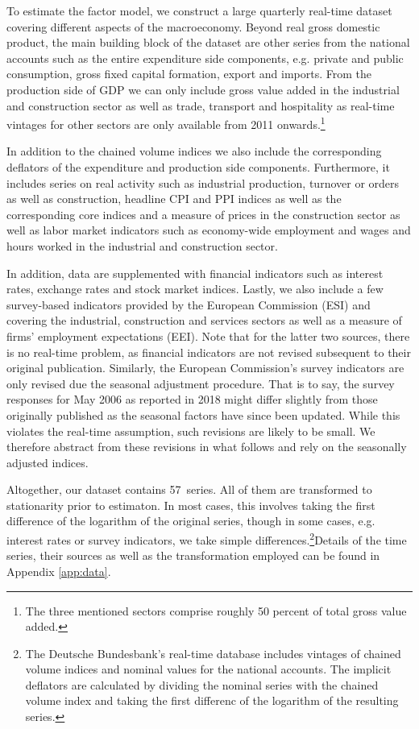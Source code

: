 \documentclass[notitlepage,a4paper,12pt]{article}
\newcommand\NumSeries{57}
\begin{document}
To estimate the factor model, we construct a large quarterly real-time dataset covering different aspects of the macroeconomy. Beyond real gross domestic product, the main building block of the dataset are other series from the national accounts such as the entire expenditure side components, e.g. private and public consumption, gross fixed capital formation, export and imports. From the production side of GDP we can only include gross value added in the industrial and construction sector as well as trade, transport and hospitality as real-time vintages for other sectors are only available from 2011 onwards.\footnote{The three mentioned sectors comprise roughly 50 percent of total gross value added.} 

In addition to the chained volume indices we also include the corresponding deflators of the expenditure and production side components. Furthermore, it includes series on real activity such as industrial production, turnover or orders as well as construction, headline CPI and PPI indices as well as the corresponding core indices and a measure of prices in the construction sector as well as labor market indicators such as economy-wide employment and wages and hours worked in the industrial and construction sector.    

In addition, data are supplemented with financial indicators such as interest rates, exchange rates and stock market indices. Lastly, we also include a few survey-based indicators provided by the European Commission (ESI) and covering the industrial, construction and services sectors as well as a measure of firms' employment expectations (EEI). Note that for the latter two sources, there is no real-time problem, as financial indicators are not revised subsequent to their original publication. Similarly, the European Commission's survey indicators are only revised due the seasonal adjustment procedure. That is to say, the survey responses for May 2006 as reported in 2018 might differ slightly from those originally published as the seasonal factors have since been updated. While this violates the real-time assumption, such revisions are likely to be small. We therefore abstract from these revisions in what follows  and rely on the seasonally adjusted indices.

Altogether, our dataset contains \NumSeries\ series. All of them are transformed to stationarity prior to estimaton. In most cases, this involves taking the first difference of the logarithm of the original series, though in some cases, e.g. interest rates or survey indicators, we take simple differences.\footnote{The Deutsche Bundesbank's real-time database includes vintages of chained volume indices and nominal values for the national accounts. The implicit deflators are calculated by dividing the nominal series with the chained volume index and taking the first differenc of the logarithm of the resulting series.}Details of the time series, their sources as well as the transformation employed  can be found in Appendix \ref{app:data}.
\end{document}
